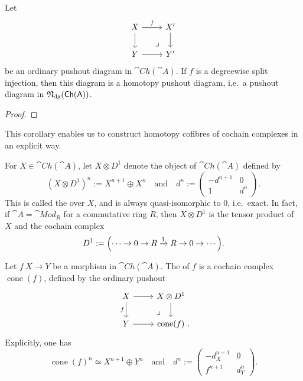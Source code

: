 \begin{corollary}\label{cor-9-o}
    Let 
    \[\begin{tikzcd}
        X\ar[r,"f"]\ar[d]\ar[dr,phantom,pos=.75,"\lrcorner"] & X'\ar[d] \\
        Y\ar[r] & Y'
    \end{tikzcd}\]
    be an ordinary pushout diagram in $\cat{Ch}(\cat{A})$.
    If $f$ is a degreewise split injection,
    then this diagram is a homotopy pushout diagram,
    i.e.\ a pushout diagram in $\mathfrak{N}_{\mathrm{dg}}(\mathsf{Ch}(\mathsf{A}))$.
\end{corollary}

\begin{proof}
    \nyw
\end{proof}

This corollary enables us to construct 
homotopy cofibres of cochain complexes in an explicit way. 

For $X\in\cat{Ch}(\cat{A})$, let $X\otimes D^1$ denote the object of $\cat{Ch}(\cat{A})$
defined by
\[ (X\otimes D^1)^n:=X^{n+1}\oplus X^n\quad\text{and}\quad d^n:=\begin{pmatrix}
    -d^{n+1} & 0 \\ 1 & d^n
\end{pmatrix}. \]
This is called the  over $X$, and is always quasi-isomorphic to $0$,
i.e.\ exact.
In fact, if $\cat{A}=\cat{Mod}_R$ for a commutative ring $R$,
then $X\otimes D^1$ is the tensor product of $X$ and the cochain complex 
\[D^1:=\Bigl(\cdots\to0\to R\xrightarrow1R\to0\to\cdots\Bigr).\]

\begin{definition}
    Let $f\:X\to Y$ be a morphism in $\cat{Ch}(\cat{A})$.
    The  of $f$ is a cochain complex $\operatorname{cone}(f)$,
    defined by the ordinary pushout
    \[\begin{tikzcd}
        X\ar[r]\ar[d,"f"']\ar[dr,phantom,pos=.75,"\lrcorner",end anchor={[xshift=-.5em]north}] & X\otimes D^1\ar[d] \\
        Y\ar[r] & \operatorname{cone}(f)\rlap{\ .}
    \end{tikzcd}\]
    Explicitly, one has
    \[ \operatorname{cone}(f)^n\simeq X^{n+1}\oplus Y^n\quad\text{and}\quad d^n:=\begin{pmatrix}
        -d^{n+1}_X & 0 \\ f^{n+1} & d^n_Y
    \end{pmatrix}. \]
\end{definition}

